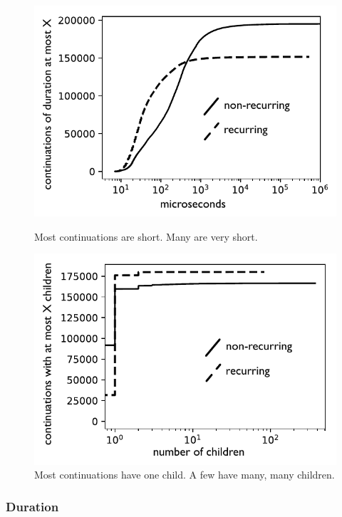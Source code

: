 \documentclass[acmsmall,anonymous,review]{acmart}\settopmatter{printfolios=true,printccs=false,printacmref=false}
\begin{document}
\begin{figure}
    \centering
    \begin{minipage}[t]{0.47\textwidth}
        \centering
        \includegraphics[width=1.0\textwidth]{Graphs/durations_bw}
        \caption{Most continuations are short.
  Many are very short.}
        \label{fig:graph_duration}
    \end{minipage}\hfill
    \begin{minipage}[t]{0.47\textwidth}
        \centering
        \includegraphics[width=1.0\textwidth]{Graphs/branching_bw}
        \caption{Most continuations have one child.
A few have many, many children.}
        \label{fig:graph_branching}
    \end{minipage}
\end{figure}

\subsubsection{Duration}
\end{document}
